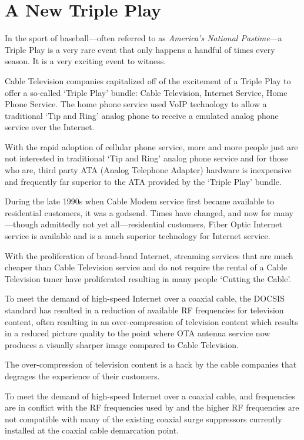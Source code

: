 \chapter{A New Triple Play}

In the sport of baseball---often referred to as \textit{America's National Pastime}---a
Triple Play is a very rare event that only happens a handful of times every season.
It is a very exciting event to witness.

Cable Television companies capitalized off of the excitement of a Triple Play to
offer a so-called `Triple Play' bundle: Cable Television, Internet Service, Home
Phone Service. The home phone service used VoIP technology to allow a traditional
`Tip and Ring' analog phone to receive a emulated analog phone service over the
Internet.

With the rapid adoption of cellular phone service, more and more people just are
not interested in traditional `Tip and Ring' analog phone service and for those
who are, third party ATA (Analog Telephone Adapter) hardware is inexpensive and
frequently far superior to the ATA provided by the `Triple Play' bundle.

During the late 1990s when Cable Modem service first became available to residential
customers, it was a godsend. Times have changed, and now for many---though admittedly
not yet all---residential customers, Fiber Optic Internet service is available and
is a much superior technology for Internet service.

With the proliferation of broad-band Internet, streaming services that are much
cheaper than Cable Television service and do not require the rental of a Cable Television
tuner have proliferated resulting in many people `Cutting the Cable'.

To meet the demand of high-speed Internet over a coaxial cable, the DOCSIS standard
has resulted in a reduction of available RF frequencies for television content,
often resulting in an over-compression of television content which results in a
reduced picture quality to the point where OTA antenna service now produces a visually
sharper image compared to Cable Television.

The over-compression of television content is a hack by the cable companies that
degrages the experience of their customers.

To meet the demand of high-speed Internet over a coaxial cable,  and
 frequencies are in conflict with the RF frequencies used by
\xdband{} and the higher RF frequencies are not compatible with many of the
existing coaxial surge suppressors currently installed at the coaxial cable
demarcation point.

